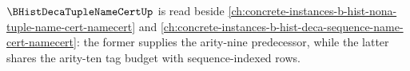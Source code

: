 $\BHistDecaTupleNameCertUp$ is read beside \autoref{ch:concrete-instances-b-hist-nona-tuple-name-cert-namecert} and \autoref{ch:concrete-instances-b-hist-deca-sequence-name-cert-namecert}: the former supplies the arity-nine predecessor, while the latter shares the arity-ten tag budget with sequence-indexed rows.


